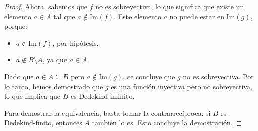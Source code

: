 \documentclass[a4,10pt]{aleph-notas}
\begin{document}
\begin{proof}
    Ahora, sabemos que \( f \) no es sobreyectiva, lo que significa que existe un elemento \( a \in A \) tal que \( a \notin \text{Im}(f) \). Este elemento \( a \) no puede estar en \( \text{Im}(g) \), porque:
    \begin{itemize}
        \item \( a \notin \text{Im}(f) \), por hipótesis.
        \item \( a \notin B \setminus A \), ya que \( a \in A \).
    \end{itemize}

    Dado que \( a \in A \subseteq B \) pero \( a \notin \text{Im}(g) \), se concluye que \( g \) no es sobreyectiva. Por lo tanto, hemos demostrado que \( g \) es una función inyectiva pero no sobreyectiva, lo que implica que \( B \) es Dedekind-infinito.

    Para demostrar la equivalencia, basta tomar la contrarrecíproca: si \( B \) es Dedekind-finito, entonces \( A \) también lo es. Esto concluye la demostración.
\end{proof}
    
\end{document}
